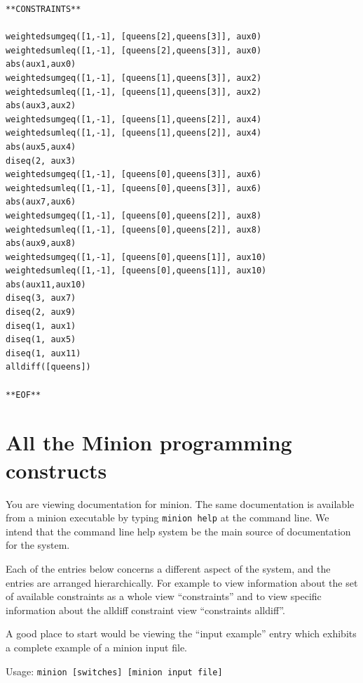 \documentclass[oneside]{book}
\begin{document}
\begin{verbatim}
**CONSTRAINTS**

weightedsumgeq([1,-1], [queens[2],queens[3]], aux0)
weightedsumleq([1,-1], [queens[2],queens[3]], aux0)
abs(aux1,aux0)
weightedsumgeq([1,-1], [queens[1],queens[3]], aux2)
weightedsumleq([1,-1], [queens[1],queens[3]], aux2)
abs(aux3,aux2)
weightedsumgeq([1,-1], [queens[1],queens[2]], aux4)
weightedsumleq([1,-1], [queens[1],queens[2]], aux4)
abs(aux5,aux4)
diseq(2, aux3)
weightedsumgeq([1,-1], [queens[0],queens[3]], aux6)
weightedsumleq([1,-1], [queens[0],queens[3]], aux6)
abs(aux7,aux6)
weightedsumgeq([1,-1], [queens[0],queens[2]], aux8)
weightedsumleq([1,-1], [queens[0],queens[2]], aux8)
abs(aux9,aux8)
weightedsumgeq([1,-1], [queens[0],queens[1]], aux10)
weightedsumleq([1,-1], [queens[0],queens[1]], aux10)
abs(aux11,aux10)
diseq(3, aux7)
diseq(2, aux9)
diseq(1, aux1)
diseq(1, aux5)
diseq(1, aux11)
alldiff([queens])

**EOF**
\end{verbatim}

\appendix
\chapter{All the Minion programming constructs}\label{chap:all}
You are viewing documentation for minion. The same 
documentation is available from a minion executable by 
typing \texttt{minion help} at the command line.
We intend that the command line help system be the 
main source of documentation for the system.

Each of the entries below concerns a different aspect
of the system, and the entries are arranged hierarchically.
For example to view information about the set of available
constraints as a whole view ``constraints'' and to view
specific information about the alldiff constraint view 
``constraints alldiff''.

A good place to start would be viewing the 
``input example'' entry which exhibits a complete
example of a minion input file.

Usage: \texttt{minion [switches] [minion input file]}





\end{document}
